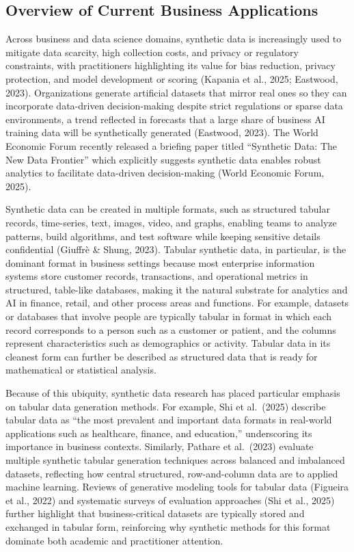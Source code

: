 \documentclass[12pt,a4paper]{article}
\begin{document}
\subsection{Overview of Current Business Applications}

Across business and data science domains, synthetic data is increasingly used to mitigate data scarcity, high collection costs, and privacy or regulatory constraints, with practitioners highlighting its value for bias reduction, privacy protection, and model development or scoring (Kapania et al., 2025; Eastwood, 2023). Organizations generate artificial datasets that mirror real ones so they can incorporate data-driven decision-making despite strict regulations or sparse data environments, a trend reflected in forecasts that a large share of business AI training data will be synthetically generated (Eastwood, 2023). The World Economic Forum recently released a briefing paper titled ``Synthetic Data: The New Data Frontier'' which explicitly suggests synthetic data enables robust analytics to facilitate data-driven decision-making (World Economic Forum, 2025).

Synthetic data can be created in multiple formats, such as structured tabular records, time-series, text, images, video, and graphs, enabling teams to analyze patterns, build algorithms, and test software while keeping sensitive details confidential (Giuffr\`{e} \& Shung, 2023). Tabular synthetic data, in particular, is the dominant format in business settings because most enterprise information systems store customer records, transactions, and operational metrics in structured, table-like databases, making it the natural substrate for analytics and AI in finance, retail, and other process areas and functions. For example, datasets or databases that involve people are typically tabular in format in which each record corresponds to a person such as a customer or patient, and the columns represent characteristics such as demographics or activity. Tabular data in its cleanest form can further be described as structured data that is ready for mathematical or statistical analysis.

Because of this ubiquity, synthetic data research has placed particular emphasis on tabular data generation methods. For example, Shi et al.\ (2025) describe tabular data as ``the most prevalent and important data formats in real-world applications such as healthcare, finance, and education,'' underscoring its importance in business contexts. Similarly, Pathare et al.\ (2023) evaluate multiple synthetic tabular generation techniques across balanced and imbalanced datasets, reflecting how central structured, row-and-column data are to applied machine learning. Reviews of generative modeling tools for tabular data (Figueira et al., 2022) and systematic surveys of evaluation approaches (Shi et al., 2025) further highlight that business-critical datasets are typically stored and exchanged in tabular form, reinforcing why synthetic methods for this format dominate both academic and practitioner attention.
\end{document}
